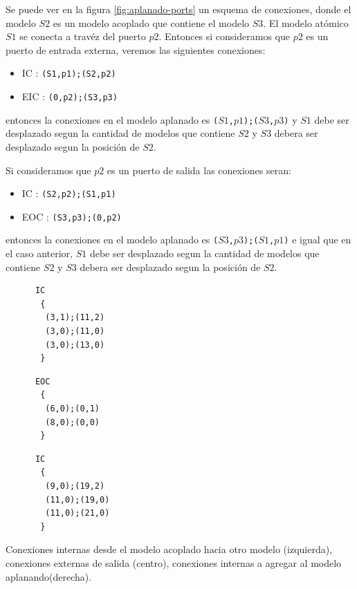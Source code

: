 \begin{itemize}
	Se puede ver en la figura \ref{fig:aplanado-ports} un esquema de conexiones, donde el modelo $S2$ es un modelo acoplado que contiene el modelo $S3$. El modelo atómico $S1$ se conecta a travéz del puerto $p2$.
	 Entonces si consideramos que $p2$ es un puerto de entrada externa, veremos las siguientes conexiones:

	\begin{itemize}
	\item IC : \texttt{(S1,p1);(S2,p2)}
	\item EIC : \texttt{(0,p2);(S3,p3)}
	\end{itemize}

	entonces la conexiones en el modelo aplanado es \texttt{($S1$,$p1$);($S3$,$p3$)} y $S1$ debe ser desplazado segun la cantidad de modelos que contiene $S2$ y 
	$S3$ debera ser desplazado segun la posición de $S2$.

	Si consideramos que $p2$ es un puerto de salida las conexiones seran:

	\begin{itemize}
	\item IC : \texttt{(S2,p2);(S1,p1)}
	\item EOC : \texttt{(S3,p3);(0,p2)}
	\end{itemize}

	entonces la conexiones en el modelo aplanado es \texttt{($S3$,$p3$);($S1$,$p1$)} e igual que en el caso anterior, $S1$ debe ser desplazado segun la 
	cantidad de modelos que contiene $S2$ y $S3$ debera ser desplazado segun la posición de $S2$.


\begin{listing}
\begin{minipage}[t]{0.3\linewidth}
\begin{verbatim}
      IC
       {
        (3,1);(11,2)
        (3,0);(11,0)
        (3,0);(13,0)
       }
\end{verbatim}
\end{minipage}
\begin{minipage}[t]{0.3\linewidth}
\begin{verbatim}
      EOC
       {
        (6,0);(0,1)
        (8,0);(0,0)
       }
\end{verbatim}
\end{minipage}
\begin{minipage}[t]{0.3\linewidth}
\begin{verbatim}
      IC
       {
        (9,0);(19,2)
        (11,0);(19,0)
        (11,0);(21,0)
       }
\end{verbatim}
\end{minipage}
\label{lst:conexiones3}
\caption{Conexiones internas desde el modelo acoplado hacia otro modelo (izquierda), conexiones externas de salida (centro), conexiones internas a agregar al modelo aplanando(derecha).}
\end{listing}


\end{itemize}
